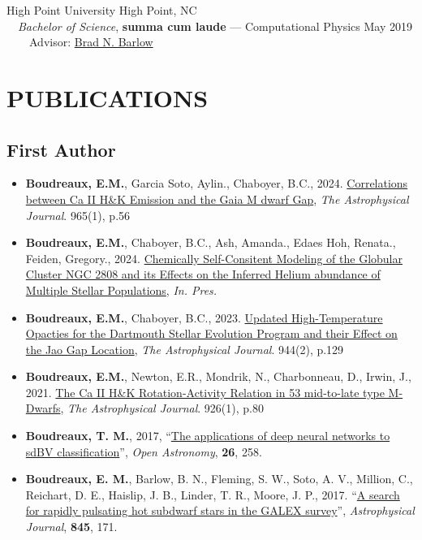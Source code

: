 \documentclass[margin, 10pt]{res} %
\begin{document}
\begin{resume}
{\large High Point University} \hfill High Point, NC\\
	{\-\ \-\ \small \textit{Bachelor of Science}, \textbf{summa cum laude} --- Computational Physics} \hfill May 2019\\
  {\-\ \-\ \-\ \-\ \small Advisor: \href{https://tarheels.live/bbarlow/}{Brad N. Barlow}} \\

\section{PUBLICATIONS}
\subsection{First Author}
\begin{itemize}
  \item \textbf{Boudreaux, E.M.}, Garcia Soto, Aylin., Chaboyer, B.C., 2024. \href{https://ui.adsabs.harvard.edu/abs/2024arXiv240214984B/abstract}{Correlations between Ca II H\&K Emission and the Gaia M dwarf Gap}, \textit{The Astrophysical Journal}. 965(1), p.56
  \item \textbf{Boudreaux, E.M.}, Chaboyer, B.C., Ash, Amanda., Edaes Hoh, Renata., Feiden, Gregory., 2024. \href{https://ui.adsabs.harvard.edu/abs/2024arXiv241117562B/abstract}{Chemically Self-Consitent Modeling of the Globular Cluster NGC 2808 and its Effects on the Inferred Helium abundance of Multiple Stellar Populations}, \textit{In. Pres.}
	\item \textbf{Boudreaux, E.M.}, Chaboyer, B.C., 2023. \href{https://ui.adsabs.harvard.edu/abs/2023arXiv230110798B/abstract}{Updated High-Temperature Opacties for the Dartmouth Stellar Evolution Program and their Effect on the Jao Gap Location}, \textit{The Astrophysical Journal}. 944(2), p.129
	\item \textbf{Boudreaux, E.M.}, Newton, E.R., Mondrik, N., Charbonneau, D., Irwin, J., 2021. \href{https://ui.adsabs.harvard.edu/abs/2022ApJ...929...80B/abstract}{The Ca II H\&K Rotation-Activity Relation in 53 mid-to-late type M-Dwarfs}, \textit{The Astrophysical Journal}. 926(1), p.80
\item \textbf{Boudreaux, T. M.}, 2017, ``\href{https://ui.adsabs.harvard.edu/#abs/2017OAst...26..258B/abstract}{The applications of deep neural networks to sdBV classification}'', \textit{Open Astronomy}, \textbf{26}, 258.
\item \textbf{Boudreaux, E. M.}, Barlow, B. N., Fleming, S. W., Soto, A. V., Million, C., Reichart, D. E., Haislip, J. B., Linder, T. R., Moore, J. P., 2017. ``\href{https://ui.adsabs.harvard.edu/#abs/2017ApJ...845..171B/abstract}{A search for rapidly pulsating hot subdwarf stars in the GALEX survey}'', \textit{Astrophysical Journal}, \textbf{845}, 171.
\end{itemize}

\end{resume}
\end{document}
